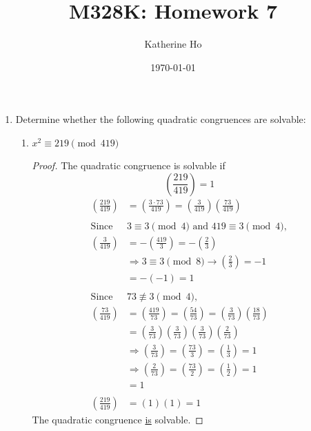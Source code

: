 \documentclass[11pt]{article}
\title{M328K: Homework 7}
\author{Katherine Ho}
\date\today
\theoremstyle{definition}
\newcommand{\legendre}[2]{\ensuremath{\left( \frac{#1}{#2} \right) }}
\begin{document}
\maketitle

\begin{enumerate}

    \item Determine whether the following quadratic congruences are solvable:
    \begin{enumerate}
        \item $x^2\equiv 219 \pmod{419}$
        \begin{proof}
            The quadratic congruence is solvable if 
            \[
                \legendre{219}{419} = 1
            \]
            \begin{align*}
                \legendre{219}{419}
                &= \legendre{3\cdot 73}{419}
                = \legendre{3}{419}\legendre{73}{419} \\\\
                \text{Since } &3\equiv 3\pmod{4} \text{ and } 419\equiv 3\pmod{4}, \\
                \legendre{3}{419}
                &= -\legendre{419}{3} 
                = -\legendre{2}{3} \\
                & \Longrightarrow 3\equiv 3\pmod{8}\rightarrow\legendre{2}{3}=-1\\
                &= -(-1) = 1 \\\\
                \text{Since } &73\not\equiv 3\pmod{4}, \\
                \legendre{73}{419}
                &= \legendre{419}{73} 
                = \legendre{54}{73}
                = \legendre{3}{73}\legendre{18}{73} \\
                &= \legendre{3}{73}\legendre{3}{73}\legendre{3}{73}\legendre{2}{73} \\
                &\Longrightarrow\legendre{3}{73} = \legendre{73}{3} = \legendre{1}{3} = 1 \\
                &\Longrightarrow\legendre{2}{73} = \legendre{73}{2} = \legendre{1}{2} = 1 \\
                &= 1 \\\\
                \legendre{219}{419} &= (1)(1) = 1
            \end{align*}
            The quadratic congruence \underline{is} solvable.
        \end{proof}


\end{enumerate}
\end{enumerate}
\end{document}
